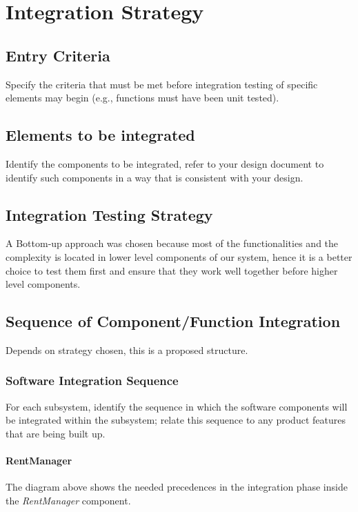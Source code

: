 \section{Integration Strategy}

\subsection{Entry Criteria}
Specify the criteria that must be met before integration testing of specific elements may begin (e.g., functions must have been unit tested).

\subsection{Elements to be integrated}
Identify the components to be integrated, refer to your design document to identify such components in a way that is consistent with your design.

\subsection{Integration Testing Strategy}
A Bottom-up approach was chosen because most of the functionalities and the complexity is located in lower level components of our system, hence it is a better choice to test them first and ensure that they work well together before higher level components.

\subsection{Sequence of Component/Function Integration}
Depends on strategy chosen, this is a proposed structure.

\subsubsection{Software Integration Sequence}
For each subsystem, identify the sequence in which the software components will be integrated within the subsystem; relate this sequence to any product features that are being built up.

\paragraph{RentManager} 
The diagram above shows the needed precedences in the integration phase inside the \emph{RentManager} component.
\paragraph{}

